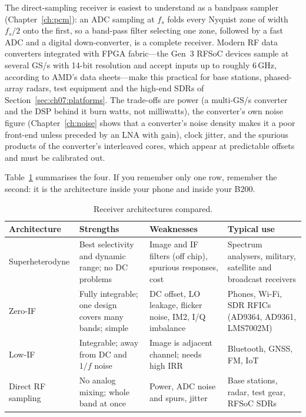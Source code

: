 The direct-sampling receiver is easiest to understand as a bandpass sampler (Chapter~\ref{ch:pcm}):
an ADC sampling at $f_s$ folds every Nyquist zone of width $f_s/2$ onto the first, so a band-pass filter
selecting one zone, followed by a fast ADC and a digital down-converter, is a complete receiver. Modern
RF data converters integrated with FPGA fabric---the Gen~3 RFSoC devices sample at several GS/s with
14-bit resolution and accept inputs up to roughly 6\,GHz, according to AMD's data sheets---make this
practical for base stations, phased-array radars, test equipment and the high-end SDRs of
Section~\ref{sec:ch07:platforms}. The trade-offs are power (a multi-GS/s converter and the DSP behind it
burn watts, not milliwatts), the converter's own noise figure (Chapter~\ref{ch:noise} shows that a
converter's noise density makes it a poor front-end unless preceded by an LNA with gain), clock jitter,
and the spurious products of the converter's interleaved cores, which appear at predictable offsets and
must be calibrated out.

Table~\ref{tab:ch07:arch} summarises the four. If you remember only one row, remember the second:
it is the architecture inside your phone and inside your B200.

\begin{table}[htbp]\centering\small
\caption{Receiver architectures compared.}
\label{tab:ch07:arch}
\begin{tabular}{>{\raggedright\arraybackslash}p{2.3cm}>{\raggedright\arraybackslash}p{3.3cm}>{\raggedright\arraybackslash}p{3.4cm}>{\raggedright\arraybackslash}p{3.4cm}}
\toprule
Architecture & Strengths & Weaknesses & Typical use \\
\midrule
Superhet\-ero\-dyne & Best selectivity and dynamic range; no DC problems & Image and IF filters (off chip), spurious responses, cost & Spectrum analysers, military, satellite and broadcast receivers \\
Zero-IF & Fully integrable; one design covers many bands; simple & DC offset, LO leakage, flicker noise, IM2, I/Q imbalance & Phones, Wi-Fi, SDR RFICs (AD9364, AD9361, LMS7002M) \\
Low-IF & Integrable; away from DC and $1/f$ noise & Image is adjacent channel; needs high IRR & Bluetooth, GNSS, FM, IoT \\
Direct RF sampling & No analog mixing; whole band at once & Power, ADC noise and spurs, jitter & Base stations, radar, test gear, RFSoC SDRs \\
\bottomrule
\end{tabular}
\end{table}

